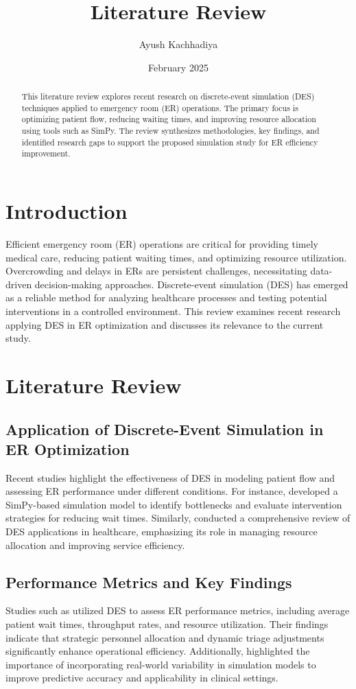 \documentclass{article}
\title{Literature Review}
\author{Ayush Kachhadiya}
\date{February 2025}
\begin{document}
\maketitle

\begin{abstract}
This literature review explores recent research on discrete-event simulation (DES) techniques applied to emergency room (ER) operations. The primary focus is optimizing patient flow, reducing waiting times, and improving resource allocation using tools such as SimPy. The review synthesizes methodologies, key findings, and identified research gaps to support the proposed simulation study for ER efficiency improvement.
\end{abstract}

\section{Introduction}
Efficient emergency room (ER) operations are critical for providing timely medical care, reducing patient waiting times, and optimizing resource utilization. Overcrowding and delays in ERs are persistent challenges, necessitating data-driven decision-making approaches. Discrete-event simulation (DES) has emerged as a reliable method for analyzing healthcare processes and testing potential interventions in a controlled environment. This review examines recent research applying DES in ER optimization and discusses its relevance to the current study.

\section{Literature Review}

\subsection{Application of Discrete-Event Simulation in ER Optimization}
Recent studies highlight the effectiveness of DES in modeling patient flow and assessing ER performance under different conditions. For instance, \cite{battu2022} developed a SimPy-based simulation model to identify bottlenecks and evaluate intervention strategies for reducing wait times. Similarly, \cite{serrano2021} conducted a comprehensive review of DES applications in healthcare, emphasizing its role in managing resource allocation and improving service efficiency.

\subsection{Performance Metrics and Key Findings}
Studies such as \cite{pinto2021} utilized DES to assess ER performance metrics, including average patient wait times, throughput rates, and resource utilization. Their findings indicate that strategic personnel allocation and dynamic triage adjustments significantly enhance operational efficiency. Additionally, \cite{angler2024} highlighted the importance of incorporating real-world variability in simulation models to improve predictive accuracy and applicability in clinical settings.
\end{document}
